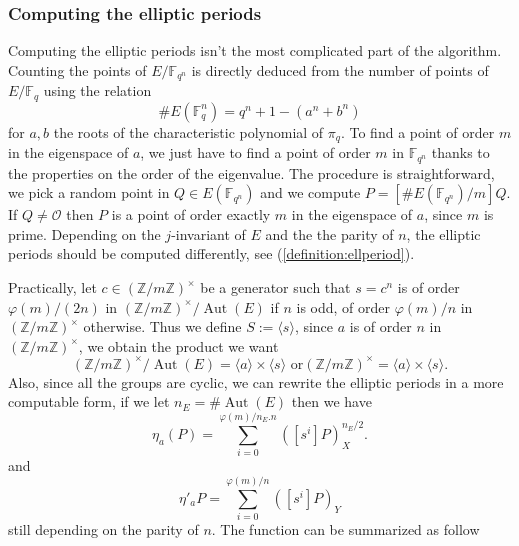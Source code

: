 \documentclass[12pt]{article}
\theoremstyle{plain}
\theoremstyle{definition}
\DeclareMathOperator{\Aut}{Aut}
\def\Z{\ensuremath{\mathbb{Z}}}
\def\F{\ensuremath{\mathbb{F}}}
\newcounter{algorithm}
\begin{document}
\subsubsection{Computing the elliptic periods}

Computing the elliptic periods isn't the most complicated part of the algorithm.
Counting the points of $E/\F_{q^n}$ is directly deduced from the number of
points of $E/\F_q$ using the relation
\begin{equation}
\#E(\F_q^n)=q^n+1-(a^n+b^n)
\end{equation}
for $a, b$ the roots of the characteristic polynomial of $\pi_q$. To find a
point of order $m$ in the eigenspace of $a$, we just have to find a point of
order $m$ in $\F_{q^n}$ thanks to the properties on the order of the eigenvalue.
The procedure is straightforward, we pick a random point in $Q\in E(\F_{q^n})$
and we compute $P = [\#E(\F_{q^n})/m]Q$. If $Q\neq\mathcal{O}$ then $P$ is a
point of order exactly $m$ in the eigenspace of $a$, since $m$ is prime.
Depending on the $j$-invariant of $E$ and the the parity of $n$, the elliptic 
periods should be computed differently, see (\ref{definition:ellperiod}).\par 
Practically, let $c\in(\Z/m\Z)^{\times}$ be a generator such that $s = c^n$ is 
of order $\varphi(m)/(2n)$ in $(\Z/m\Z)^{\times}/\Aut(E)$ if $n$ is odd, of
order $\varphi(m)/n$ in $(\Z/m\Z)^{\times}$ otherwise. Thus we define $S 
:= \langle{s}\rangle$, since $a$ is of order $n$ in
$(\Z/m\Z)^{\times}$, we obtain the product we want
\[
(\Z/m\Z)^{\times}/\Aut(E) = \langle{a}\rangle\times\langle{s}\rangle \text{ or
} (\Z/m\Z)^{\times} = \langle{a}\rangle\times\langle{s}\rangle.
\]
Also, since all the groups are cyclic, we can rewrite the elliptic periods in a
more computable form, if we let $n_E = \#\Aut(E)$ then we have
\begin{equation}
\eta_a(P) = \sum_{i = 0}^{\varphi(m)/n_E.n}{\left([s^i]P\right)_X^{n_E/2}}.
\end{equation}
and
\begin{equation}
\eta'_a{P} = \sum_{i=0}^{\varphi(m)/n}{\left([s^i]P\right)_Y}
\end{equation}
still depending on the parity of $n$. The function can be summarized as follow
\end{document}
